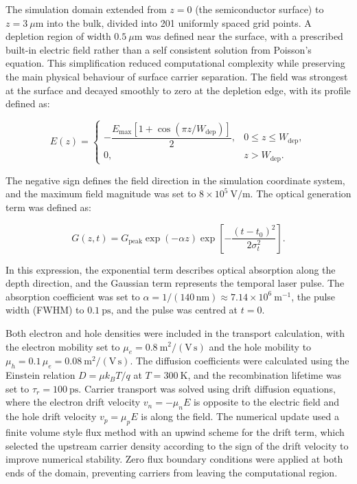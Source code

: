 \documentclass[12pt]{final_project_report}
\begin{document}
The simulation domain extended from $z = 0$ (the semiconductor surface) to $z = 3~\mu\mathrm{m}$ into the bulk, divided into 201 uniformly spaced grid points. A depletion region of width $0.5~\mu\mathrm{m}$ was defined near the surface, with a prescribed built-in electric field rather than a self consistent solution from Poisson's equation. This simplification reduced computational complexity while preserving the main physical behaviour of surface carrier separation. The field was strongest at the surface and decayed smoothly to zero at the depletion edge, with its profile defined as:

\begin{equation}
E(z) =
\begin{cases}
-\dfrac{E_{\max}\left[1+\cos\left(\pi z/W_{\mathrm{dep}}\right)\right]}{2}, & 0 \leq z \leq W_{\mathrm{dep}}, \\[6pt]
0, & z > W_{\mathrm{dep}}.
\end{cases}
\label{eq:built_in_field_profile}
\end{equation}

The negative sign defines the field direction in the simulation coordinate system, and the maximum field magnitude was set to $8 \times 10^{5}~\mathrm{V/m}$. The optical generation term was defined as:

\begin{equation}
G(z,t) =
G_{\mathrm{peak}}
\exp(-\alpha z)
\exp\left[-\frac{(t-t_0)^2}{2\sigma_t^2}\right].
\label{eq:built_in_generation}
\end{equation}

In this expression, the exponential term describes optical absorption along the depth direction, and the Gaussian term represents the temporal laser pulse. The absorption coefficient was set to $\alpha = 1/(140\,\mathrm{nm}) \approx 7.14 \times 10^{6}~\mathrm{m^{-1}}$, the pulse width (FWHM) to $0.1~\mathrm{ps}$, and the pulse was centred at $t = 0$.

Both electron and hole densities were included in the transport calculation, with the electron mobility set to $\mu_e = 0.8~\mathrm{m^2/(V\,s)}$ and the hole mobility to $\mu_h = 0.1\,\mu_e = 0.08~\mathrm{m^2/(V\,s)}$. The diffusion coefficients were calculated using the Einstein relation $D = \mu k_B T / q$ at $T = 300~\mathrm{K}$, and the recombination lifetime was set to $\tau_r = 100~\mathrm{ps}$. Carrier transport was solved using drift diffusion equations, where the electron drift velocity $v_n = -\mu_n E$ is opposite to the electric field and the hole drift velocity $v_p = \mu_p E$ is along the field. The numerical update used a finite volume style flux method with an upwind scheme for the drift term, which selected the upstream carrier density according to the sign of the drift velocity to improve numerical stability. Zero flux boundary conditions were applied at both ends of the domain, preventing carriers from leaving the computational region.
\end{document}
